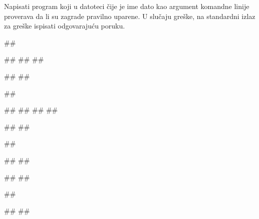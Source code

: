 \begin{Exercise}[label=p3_x2]         
Napisati program koji u datoteci čije je ime dato kao argument komandne linije proverava da li su zagrade pravilno uparene.
U slučaju greške, na standardni izlaz za greške ispisati odgovarajuću poruku.

\begin{miditest}
\begin{upotreba}{1}
##

##
##
##

#\naslovIzlaz#
##
\end{upotreba}
\end{miditest}
\begin{miditest}
\begin{upotreba}{2}
##

##
##
##
##

#\naslovIzlaz#
##
\end{upotreba}
\end{miditest}

\begin{miditest}
\begin{upotreba}{3}
##

##
##

#\naslovIzlaz#
##
\end{upotreba}
\end{miditest}
\begin{miditest}
\begin{upotreba}{4}
##

#\naslovIzlazZaGresku#
##
\end{upotreba}
\end{miditest}
\end{Exercise}
\begin{Answer}[ref=p3_x2]
\end{Answer}


